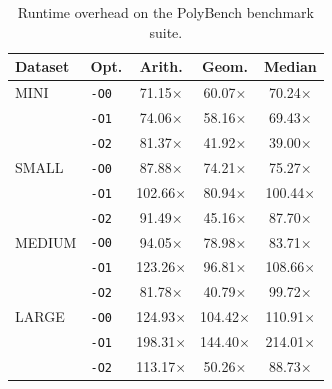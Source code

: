 \begin{table}
  \caption{Runtime overhead on the PolyBench benchmark suite.}
  \label{tab:polybench_overhead}
  \centering
  \begin{tabular}{llccc}
    \toprule
    Dataset & Opt. & Arith. & Geom. & Median\\
    \midrule
    MINI 
        & \texttt{-O0} & 71.15$\times$ & 60.07$\times$ & 70.24$\times$ \\
        & \texttt{-O1} & 74.06$\times$ & 58.16$\times$ & 69.43$\times$ \\
        & \texttt{-O2} & 81.37$\times$ & 41.92$\times$ & 39.00$\times$ \\
    \midrule
    SMALL
        & \texttt{-O0} & 87.88$\times$ & 74.21$\times$ & 75.27$\times$ \\
        & \texttt{-O1} & 102.66$\times$ & 80.94$\times$ & 100.44$\times$ \\
        & \texttt{-O2} & 91.49$\times$ & 45.16$\times$ & 87.70$\times$ \\
    \midrule
    MEDIUM
        & \texttt{-O0} & 94.05$\times$ & 78.98$\times$ & 83.71$\times$ \\
        & \texttt{-O1} & 123.26$\times$ & 96.81$\times$ & 108.66$\times$ \\
        & \texttt{-O2} & 81.78$\times$ & 40.79$\times$ & 99.72$\times$ \\
    \midrule
    LARGE
        & \texttt{-O0} & 124.93$\times$ & 104.42$\times$ & 110.91$\times$ \\
        & \texttt{-O1} & 198.31$\times$ & 144.40$\times$ & 214.01$\times$ \\
        & \texttt{-O2} & 113.17$\times$ & 50.26$\times$ & 88.73$\times$ \\
  \bottomrule
\end{tabular}
\end{table}